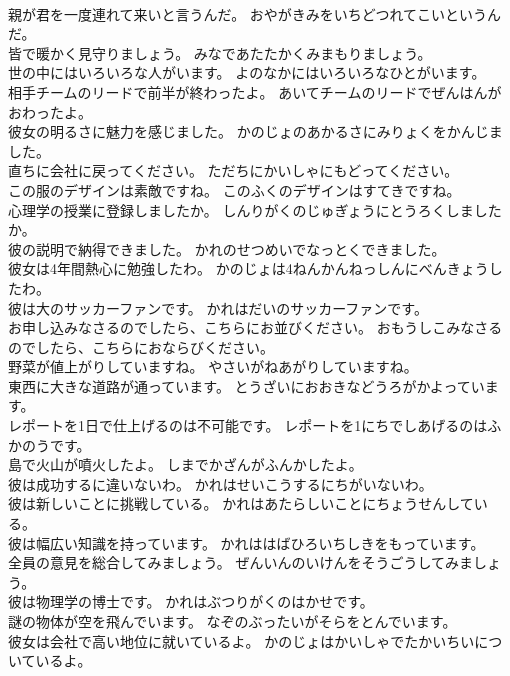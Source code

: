 \documentclass[8pt]{extreport}
\begin{document}
\begin{CJK}{UTF8}{min}
\\	親が君を一度連れて来いと言うんだ。	おやがきみをいちどつれてこいというんだ。 
\\	皆で暖かく見守りましょう。	みなであたたかくみまもりましょう。 
\\	世の中にはいろいろな人がいます。	よのなかにはいろいろなひとがいます。 
\\	相手チームのリードで前半が終わったよ。	あいてチームのリードでぜんはんがおわったよ。 
\\	彼女の明るさに魅力を感じました。	かのじょのあかるさにみりょくをかんじました。 
\\	直ちに会社に戻ってください。	ただちにかいしゃにもどってください。 
\\	この服のデザインは素敵ですね。	このふくのデザインはすてきですね。 
\\	心理学の授業に登録しましたか。	しんりがくのじゅぎょうにとうろくしましたか。 
\\	彼の説明で納得できました。	かれのせつめいでなっとくできました。 
\\	彼女は4年間熱心に勉強したわ。	かのじょは4ねんかんねっしんにべんきょうしたわ。 
\\	彼は大のサッカーファンです。	かれはだいのサッカーファンです。 
\\	お申し込みなさるのでしたら、こちらにお並びください。	おもうしこみなさるのでしたら、こちらにおならびください。 
\\	野菜が値上がりしていますね。	やさいがねあがりしていますね。 
\\	東西に大きな道路が通っています。	とうざいにおおきなどうろがかよっています。 
\\	レポートを1日で仕上げるのは不可能です。	レポートを1にちでしあげるのはふかのうです。 
\\	島で火山が噴火したよ。	しまでかざんがふんかしたよ。 
\\	彼は成功するに違いないわ。	かれはせいこうするにちがいないわ。 
\\	彼は新しいことに挑戦している。	かれはあたらしいことにちょうせんしている。 
\\	彼は幅広い知識を持っています。	かれははばひろいちしきをもっています。 
\\	全員の意見を総合してみましょう。	ぜんいんのいけんをそうごうしてみましょう。 
\\	彼は物理学の博士です。	かれはぶつりがくのはかせです。 
\\	謎の物体が空を飛んでいます。	なぞのぶったいがそらをとんでいます。 
\\	彼女は会社で高い地位に就いているよ。	かのじょはかいしゃでたかいちいについているよ。 

\end{CJK}
\end{document}
